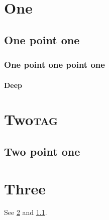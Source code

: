 \section{One}
\label{sec:org1f85fd9}
\subsection{One point one}
\label{sec:org47118c0}
\subsubsection*{One point one point one}
\label{sec:orgaf3ed89}
\paragraph*{Deep}
\label{sec:org1c59b52}
\section*{Two\hfill{}\textsc{tag}}
\label{sec:org3028fdc}
\subsection*{Two point one}
\label{sec:org0e4d337}
\section{Three}
\label{sec:org0af2b60}
See \ref{sec:org0af2b60} and \ref{sec:org47118c0}.
